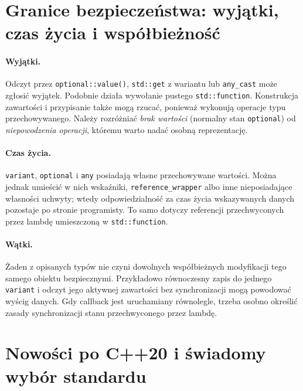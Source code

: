 \section{Granice bezpieczeństwa: wyjątki, czas życia i współbieżność}

\paragraph{Wyjątki.}
Odczyt przez \texttt{optional::value()}, \texttt{std::get} z wariantu
lub \texttt{any\_cast} może zgłosić wyjątek. Podobnie działa wywołanie
pustego \texttt{std::function}. Konstrukcja zawartości i przypisanie także mogą rzucać,
ponieważ wykonują operacje typu przechowywanego. Należy rozróżniać
\emph{brak wartości} (normalny stan \texttt{optional}) od
\emph{niepowodzenia operacji}, któremu warto nadać osobną reprezentację.

\paragraph{Czas życia.}
\texttt{variant}, \texttt{optional} i \texttt{any} posiadają własne
przechowywane wartości. Można jednak umieścić w nich wskaźniki,
\texttt{reference\_wrapper} albo inne nieposiadające własności uchwyty;
wtedy odpowiedzialność za czas życia wskazywanych danych pozostaje po
stronie programisty. To samo dotyczy referencji przechwyconych przez
lambdę umieszczoną w \texttt{std::function}.

\paragraph{Wątki.}
Żaden z opisanych typów nie czyni dowolnych współbieżnych modyfikacji
tego samego obiektu bezpiecznymi. Przykładowo równoczesny zapis do
jednego \texttt{variant} i odczyt jego aktywnej zawartości bez
synchronizacji mogą powodować wyścig danych. Gdy callback jest
uruchamiany równolegle, trzeba osobno określić zasady synchronizacji
stanu przechwyconego przez lambdę.

\section{Nowości po C++20 i świadomy wybór standardu}

